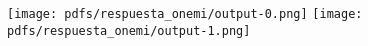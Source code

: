\texttt{[image: pdfs/respuesta\_onemi/output-0.png]}
\newline
\texttt{[image: pdfs/respuesta\_onemi/output-1.png]}
